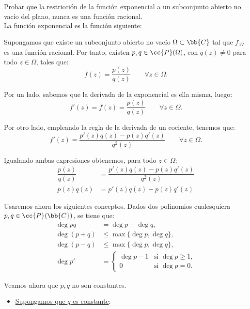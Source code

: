 \begin{ejercicio}
    Probar que la restricción de la función exponencial a un subconjunto abierto no vacío del plano, nunca es una función racional.\\

    La función exponencial es la función siguiente:

    Supongamos que existe un subconjunto abierto no vacío $\Omega\subset\bb{C}$ tal que $f_{\big|\Omega}$ es una función racional. Por tanto, existen $p,q\in\cc{P}(\Omega)$, con $q(z)\neq 0$ para todo $z\in\Omega$, tales que:
    \[
        f(z) = \dfrac{p(z)}{q(z)}\qquad \forall z\in\Omega.
    \]

    Por un lado, sabemos que la derivada de la exponencial es ella misma, luego:
    \[
        f'(z) = f(z) = \dfrac{p(z)}{q(z)}\qquad \forall z\in\Omega.
    \]

    Por otro lado, empleando la regla de la derivada de un cociente, tenemos que:
    \[
        f'(z) = \dfrac{p'(z)q(z)-p(z)q'(z)}{q^2(z)}\qquad \forall z\in\Omega.
    \]

    Igualando ambas expresiones obtenemos, para todo $z\in\Omega$:
    \begin{align}
        \dfrac{p(z)}{q(z)} &= \dfrac{p'(z)q(z)-p(z)q'(z)}{q^2(z)}\\
        p(z)q(z) &= p'(z)q(z)-p(z)q'(z)\label{eq:1}
    \end{align}

    Usaremos ahora los siguientes conceptos. Dados dos polinomios cualesquiera $p,q\in\cc{P}(\bb{C})$, se tiene que:
    \begin{align*}
        \deg pq &= \deg p + \deg q,\\
        \deg (p+q) &\leq \max\{\deg p,\deg q\},\\
        \deg (p-q) &\leq \max\{\deg p,\deg q\},\\
        \deg p' &= \begin{cases}
            \deg p - 1 & \text{si }\deg p\geq 1,\\
            0 & \text{si }\deg p = 0.
        \end{cases}
    \end{align*}

    Veamos ahora que $p,q$ no son constantes.
    \begin{itemize}
        \item \ul{Supongamos que $q$ es constante}:
        

\end{itemize}
\end{ejercicio}
